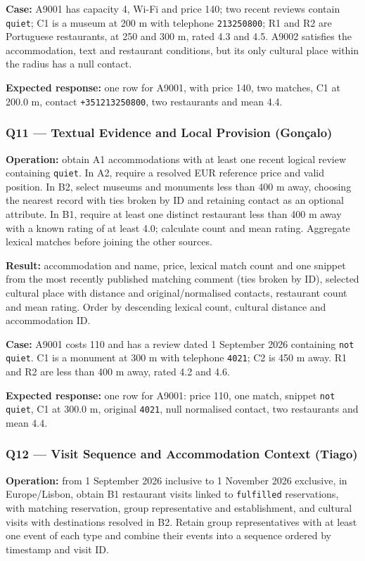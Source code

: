 \textbf{Case:} A9001 has capacity 4, Wi-Fi and price 140; two recent reviews contain \texttt{quiet}; C1 is a museum at 200 m with telephone \texttt{213250800}; R1 and R2 are Portuguese restaurants, at 250 and 300 m, rated 4.3 and 4.5. A9002 satisfies the accommodation, text and restaurant conditions, but its only cultural place within the radius has a null contact.\par
\textbf{Expected response:} one row for A9001, with price 140, two matches, C1 at 200.0 m, contact \texttt{+351213250800}, two restaurants and mean 4.4.
\subsubsection{Q11 --- Textual Evidence and Local Provision (Gonçalo)}
\textbf{Operation:} obtain A1 accommodations with at least one recent logical review containing \texttt{quiet}. In A2, require a resolved EUR reference price and valid position. In B2, select museums and monuments less than 400 m away, choosing the nearest record with ties broken by ID and retaining contact as an optional attribute. In B1, require at least one distinct restaurant less than 400 m away with a known rating of at least 4.0; calculate count and mean rating. Aggregate lexical matches before joining the other sources.

\textbf{Result:} accommodation and name, price, lexical match count and one snippet from the most recently published matching comment (ties broken by ID), selected cultural place with distance and original/normalised contacts, restaurant count and mean rating. Order by descending lexical count, cultural distance and accommodation ID.

\textbf{Case:} A9001 costs 110 and has a review dated 1 September 2026 containing \texttt{not quiet}. C1 is a monument at 300 m with telephone \texttt{4021}; C2 is 450 m away. R1 and R2 are less than 400 m away, rated 4.2 and 4.6.\par
\textbf{Expected response:} one row for A9001: price 110, one match, snippet \texttt{not quiet}, C1 at 300.0 m, original \texttt{4021}, null normalised contact, two restaurants and mean 4.4.
\subsubsection{Q12 --- Visit Sequence and Accommodation Context (Tiago)}
\textbf{Operation:} from 1 September 2026 inclusive to 1 November 2026 exclusive, in Europe/Lisbon, obtain B1 restaurant visits linked to \texttt{fulfilled} reservations, with matching reservation, group representative and establishment, and cultural visits with destinations resolved in B2. Retain group representatives with at least one event of each type and combine their events into a sequence ordered by timestamp and visit ID.

